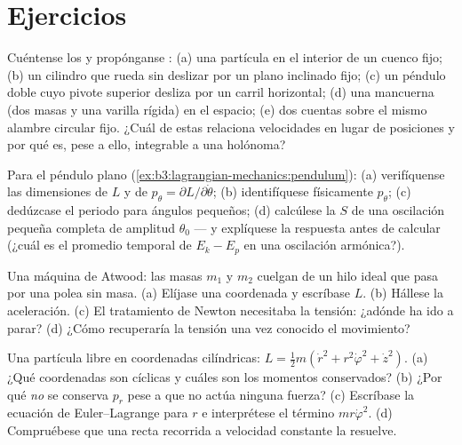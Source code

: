 \section{Ejercicios}

\begin{exercise}[$\star$]\label{exo:b3:lagrangian-mechanics:1}
Cuéntense los  y propónganse : (a) una
partícula en el interior de un cuenco fijo; (b) un cilindro que rueda sin
deslizar por un plano inclinado fijo; (c) un péndulo doble cuyo pivote
superior desliza por un carril horizontal; (d) una mancuerna (dos masas y
una varilla rígida) en el espacio; (e) dos cuentas sobre el mismo alambre
circular fijo. ¿Cuál de estas  relaciona velocidades en lugar de
posiciones y por qué es, pese a ello, integrable a una  holónoma?
\end{exercise}

\begin{exercise}[$\star$]\label{exo:b3:lagrangian-mechanics:2}
Para el péndulo plano (\cref{ex:b3:lagrangian-mechanics:pendulum}):
(a) verifíquense las dimensiones de $L$ y de $p_\theta =
\partial L/\partial\dot\theta$; (b) identifíquese físicamente $p_\theta$;
(c) dedúzcase el periodo para ángulos pequeños; (d) calcúlese la  $S$ de
una oscilación pequeña completa de amplitud $\theta_0$ --- y explíquese la
respuesta antes de calcular (¿cuál es el promedio temporal de $E_k - E_p$ en
una oscilación armónica?).
\end{exercise}

\begin{exercise}[$\star$]\label{exo:b3:lagrangian-mechanics:3}
Una máquina de Atwood: las masas $m_1$ y $m_2$ cuelgan de un hilo ideal que
pasa por una polea sin masa. (a) Elíjase una coordenada y escríbase $L$.
(b) Hállese la aceleración. (c) El tratamiento de Newton necesitaba la
tensión: ¿adónde ha ido a parar? (d) ¿Cómo recuperaría la tensión una vez
conocido el movimiento?
\end{exercise}

\begin{exercise}[$\star$]\label{exo:b3:lagrangian-mechanics:4}
Una partícula libre en coordenadas cilíndricas: $L = \tfrac12 m(\dot r^2 +
r^2\dot\varphi^2 + \dot z^2)$. (a) ¿Qué coordenadas son cíclicas y cuáles
son los momentos conservados? (b) ¿Por qué \emph{no} se conserva $p_r$ pese
a que no actúa ninguna fuerza? (c) Escríbase la ecuación de Euler--Lagrange
para $r$ e interprétese el término $mr\dot\varphi^2$. (d) Compruébese que una
recta recorrida a velocidad constante la resuelve.
\end{exercise}


